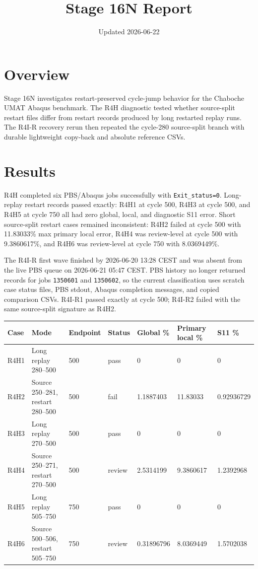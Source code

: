 \documentclass{article}
\title{Stage 16N Report}
\author{}
\date{Updated 2026-06-22}
\begin{document}
\maketitle

\section{Overview}
Stage 16N investigates restart-preserved cycle-jump behavior for the Chaboche UMAT Abaqus benchmark. The R4H diagnostic tested whether source-split restart files differ from restart records produced by long restarted replay runs. The R4I-R recovery rerun then repeated the cycle-280 source-split branch with durable lightweight copy-back and absolute reference CSVs.

\section{Results}
R4H completed six PBS/Abaqus jobs successfully with \texttt{Exit\_status=0}. Long-replay restart records passed exactly: R4H1 at cycle 500, R4H3 at cycle 500, and R4H5 at cycle 750 all had zero global, local, and diagnostic S11 error. Short source-split restart cases remained inconsistent: R4H2 failed at cycle 500 with 11.83033\% max primary local error, R4H4 was review-level at cycle 500 with 9.3860617\%, and R4H6 was review-level at cycle 750 with 8.0369449\%.

The R4I-R first wave finished by 2026-06-20 13:28 CEST and was absent from the live PBS queue on 2026-06-21 05:47 CEST. PBS history no longer returned records for jobs \texttt{1350601} and \texttt{1350602}, so the current classification uses scratch case status files, PBS stdout, Abaqus completion messages, and copied comparison CSVs. R4I-R1 passed exactly at cycle 500; R4I-R2 failed with the same source-split signature as R4H2.

\small
\setlength{\tabcolsep}{2pt}
\begin{longtable}{p{}p{}p{}p{}p{}p{}p{}}
\toprule
Case & Mode & Endpoint & Status & Global \% & Primary local \% & S11 \% \\
\midrule
R4H1 & Long replay 280--500 & 500 & pass & 0 & 0 & 0 \\
R4H2 & Source 250--281, restart 280--500 & 500 & fail & 1.1887403 & 11.83033 & 0.92936729 \\
R4H3 & Long replay 270--500 & 500 & pass & 0 & 0 & 0 \\
R4H4 & Source 250--271, restart 270--500 & 500 & review & 2.5314199 & 9.3860617 & 1.2392968 \\
R4H5 & Long replay 505--750 & 750 & pass & 0 & 0 & 0 \\
R4H6 & Source 500--506, restart 505--750 & 750 & review & 0.31896796 & 8.0369449 & 1.5702038 \\
\bottomrule
\end{longtable}
\setlength{\tabcolsep}{6pt}
\normalsize
\end{document}
